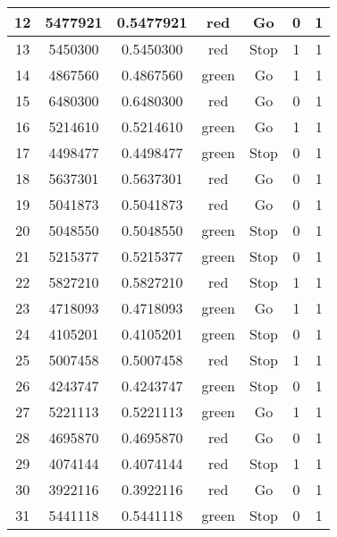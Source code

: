 \documentclass{jlreq}
\numberwithin{equation}{section}
\begin{document}
\begin{table}[H]
{\begin{tabular}{|c|c|c|c|c|c|c|}
      12           & 5477921          & 0.5477921      & red   & Go   & 0     & 1   \\ \hline
      13           & 5450300          & 0.5450300      & red   & Stop & 1     & 1   \\ \hline
      14           & 4867560          & 0.4867560      & green & Go   & 1     & 1   \\ \hline
      15           & 6480300          & 0.6480300      & red   & Go   & 0     & 1   \\ \hline
      16           & 5214610          & 0.5214610      & green & Go   & 1     & 1   \\ \hline
      17           & 4498477          & 0.4498477      & green & Stop & 0     & 1   \\ \hline
      18           & 5637301          & 0.5637301      & red   & Go   & 0     & 1   \\ \hline
      19           & 5041873          & 0.5041873      & red   & Go   & 0     & 1   \\ \hline
      20           & 5048550          & 0.5048550      & green & Stop & 0     & 1   \\ \hline
      21           & 5215377          & 0.5215377      & green & Stop & 0     & 1   \\ \hline
      22           & 5827210          & 0.5827210      & red   & Stop & 1     & 1   \\ \hline
      23           & 4718093          & 0.4718093      & green & Go   & 1     & 1   \\ \hline
      24           & 4105201          & 0.4105201      & green & Stop & 0     & 1   \\ \hline
      25           & 5007458          & 0.5007458      & red   & Stop & 1     & 1   \\ \hline
      26           & 4243747          & 0.4243747      & green & Stop & 0     & 1   \\ \hline
      27           & 5221113          & 0.5221113      & green & Go   & 1     & 1   \\ \hline
      28           & 4695870          & 0.4695870      & red   & Go   & 0     & 1   \\ \hline
      29           & 4074144          & 0.4074144      & red   & Stop & 1     & 1   \\ \hline
      30           & 3922116          & 0.3922116      & red   & Go   & 0     & 1   \\ \hline
      31           & 5441118          & 0.5441118      & green & Stop & 0     & 1   \\ \hline

\end{tabular}}
\end{table}
\end{document}
